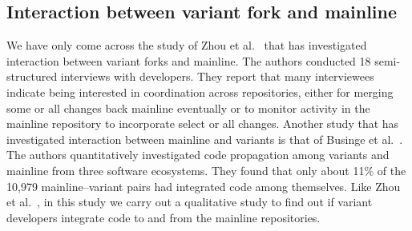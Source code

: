 \subsection{Interaction between variant fork and mainline}
We have only come across the study of Zhou et al.~\cite{Zhou:2020} that has investigated interaction between variant forks and mainline.
The authors conducted 18 semi-structured interviews with developers. They report that many interviewees indicate being interested in coordination across repositories, either for merging some or all changes back mainline eventually or to monitor activity in the mainline repository to incorporate select or all changes. Another study that has investigated interaction between mainline and variants is that of Businge et al.~\cite{businge:emse:2021}.
The authors quantitatively investigated code propagation among variants and mainline from three software ecosystems. They found that only about 11\% of the 10,979 mainline--variant pairs had integrated code among themselves. 
Like Zhou et al.~\cite{Zhou:2020}, in this study we carry out a qualitative study to find out if variant developers integrate code to and from the mainline repositories.

